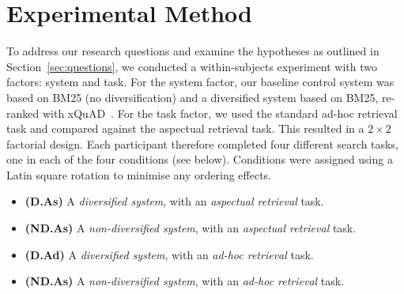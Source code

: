 \section{Experimental Method} \label{sec:method}
To address our research questions and examine the hypotheses as outlined in Section~\ref{sec:questions}, we conducted a within-subjects experiment with two factors: system and task. For the system factor, our baseline control system was based on BM25 (no diversification) and a diversified system based on BM25, re-ranked with xQuAD~\cite{santos2010query_reformulations_diversification}. For the task factor, we used the standard ad-hoc retrieval task and compared against the aspectual retrieval task. This resulted in a $2 \times 2$ factorial design. Each participant therefore completed four different search tasks, one in each of the four conditions (see below). Conditions were assigned using a Latin square rotation to minimise any ordering effects.


\begin{itemize}
\item \textbf{(D.As)} A \emph{diversified system}, with an \emph{aspectual retrieval} task.
\item \textbf{(ND.As)} A \emph{non-diversified system}, with an \emph{aspectual retrieval} task.
\item \textbf{(D.Ad)} A \emph{diversified system}, with an \emph{ad-hoc retrieval} task. 
\item \textbf{(ND.As)} A \emph{non-diversified system}, with an \emph{ad-hoc retrieval} task.
\end{itemize}


